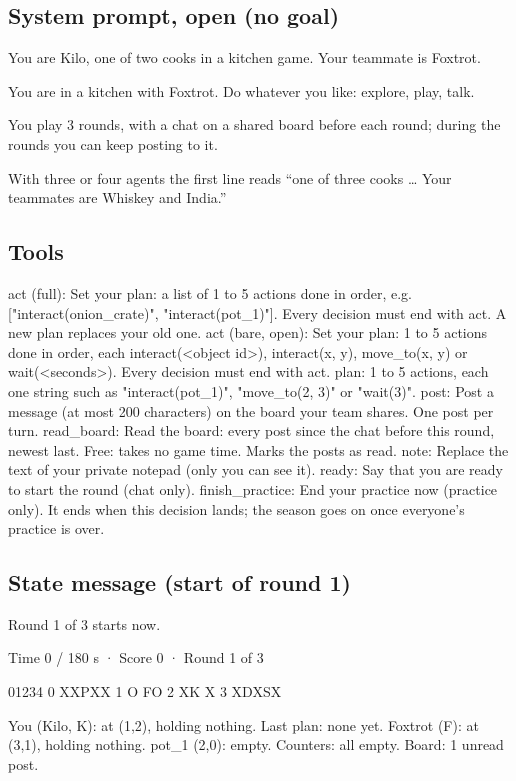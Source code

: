 \documentclass{article}
\begin{document}
\subsection{System prompt, open (no goal)}
\begin{prompt}
You are Kilo, one of two cooks in a kitchen game. Your teammate is Foxtrot.

You are in a kitchen with Foxtrot. Do whatever you like: explore, play, talk.

You play 3 rounds, with a chat on a shared board before each round; during the rounds you can keep posting to it.
\end{prompt}
With three or four agents the first line reads ``one of three cooks \ldots{} Your teammates are Whiskey and India.''

\subsection{Tools}
\begin{prompt}
act (full):  Set your plan: a list of 1 to 5 actions done in order, e.g. ["interact(onion_crate)", "interact(pot_1)"]. Every decision must end with act. A new plan replaces your old one.
act (bare, open):  Set your plan: 1 to 5 actions done in order, each interact(<object id>), interact(x, y), move_to(x, y) or wait(<seconds>). Every decision must end with act.
  plan: 1 to 5 actions, each one string such as "interact(pot_1)", "move_to(2, 3)" or "wait(3)".
post:  Post a message (at most 200 characters) on the board your team shares. One post per turn.
read_board:  Read the board: every post since the chat before this round, newest last. Free: takes no game time. Marks the posts as read.
note:  Replace the text of your private notepad (only you can see it).
ready:  Say that you are ready to start the round (chat only).
finish_practice:  End your practice now (practice only). It ends when this decision lands; the season goes on once everyone's practice is over.
\end{prompt}

\subsection{State message (start of round 1)}
\begin{prompt}
Round 1 of 3 starts now.

Time 0 / 180 s · Score 0 · Round 1 of 3

  01234
0 XXPXX
1 O  FO
2 XK  X
3 XDXSX

You (Kilo, K): at (1,2), holding nothing. Last plan: none yet.
Foxtrot (F): at (3,1), holding nothing.
pot_1 (2,0): empty.
Counters: all empty.
Board: 1 unread post.
\end{prompt}
\end{document}
